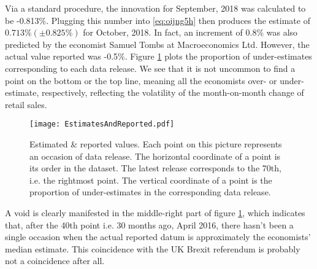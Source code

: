 \documentclass[a4paper,11pt,pdftex,twoside,titlepage]{article}
\begin{document}
Via a standard procedure, the innovation for September, 2018 was
calculated to be -0.813\%. Plugging this number into
\eqref{eq:oijng5h} then produces the estimate of
$0.713\%(\pm 0.825\%)$ for October, 2018.
In fact, an increment of 0.8\% was also predicted by the economist
Samuel Tombs at Macroeconomics Ltd. However, the actual value reported
was -0.5\%. Figure \ref{fig:vfrtg659} plots the proportion of
under-estimates corresponding to each data release. We see that it is
not uncommon to find a point on the bottom or the top line, meaning
all the economists over- or under-estimate, respectively, reflecting
the volatility of the month-on-month change of retail sales.
\begin{figure}[htb!]
  \centering
  \texttt{[image: EstimatesAndReported.pdf]}
  \caption{Estimated \& reported values. Each point on this picture
    represents an occasion of data release. The horizontal coordinate
    of a point is its order in the dataset. The latest release
    corresponds to the 70th, i.e. the rightmost point. The vertical
    coordinate of a point is the proportion of under-estimates
    in the corresponding data release.
  }
  \label{fig:vfrtg659}
\end{figure}

A void is clearly manifested in the middle-right part of figure
\ref{fig:vfrtg659}, which indicates that, after the 40th point i.e. 30
months ago, April 2016, there hasn't been a single occasion when the
actual reported datum is approximately the economists' median
estimate. This coincidence with the UK Brexit referendum is probably
not a coincidence after all.
\end{document}
